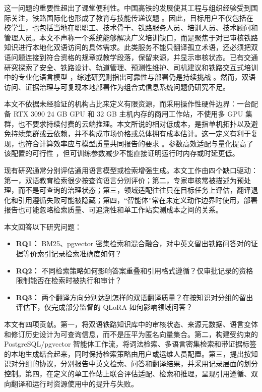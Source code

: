 这一问题的重要性超出了课堂便利性。中国高铁的发展使其工程与组织经验受到国际关注，铁路国际化也形成了教育与技能传递议题 \citep{lawrence2019hsr,xu2018education}。因此，目标用户不仅包括在校学生，也包括当地在职职工、技术骨干、铁路服务人员、培训人员、技术顾问和管理人员。本文不声称一个系统能够解决广义培训缺口，而是聚焦于对已审核铁路知识进行本地化双语访问的具体需求。此类服务不能只翻译孤立术语，还必须把双语问题连接到符合资格的规章或教学段落，保留来源，并显示审核状态。已有交通研究探索了安全、铁路设计、轨道管理、预测性维护、司机建议和铁路交互式培训中的专业化语言模型 \citep{zheng2023trafficsafety,lahnalampi2024rail,wang2024phm,song2025railway,luo2025driver,li2025training}，综述研究则指出可靠性与部署仍是持续挑战 \citep{wandelt2024transport}。然而，双语访问、证据治理与可复现本地部署作为组合式信息系统问题仍研究不足。

本文不依据未经验证的机构占比来定义有限资源，而采用操作性硬件边界：一台配备 RTX 3090 24 GB GPU 和 32 GB 主机内存的商用工作站，不使用多 GPU 集群，也不要求持续付费的云端推理。本文所说的相对低成本，是指单机拓扑以及避免持续集群或云依赖，并不构成市场价格或总体拥有成本估计。这一定义有利于复现，也符合计算效率应与模型质量共同报告的要求 \citep{schwartz2020green}。参数高效适配与量化提高了该配置的可行性 \citep{dettmers2023qlora,ding2023peft,lv2024full,wang2025peft}，但可训练参数减少不能直接证明运行时内存或时延更低。

现有研究通常分别评估通用语言模型或检索增强生成。本文工作由四个缺口驱动：第一，双语教育检索很少按查询语言分别评价；第二，专家审核常被描述为预处理，而不是可查询的治理状态；第三，领域适配往往只在目标任务上评估，翻译退化和引用遵循失败可能被隐藏；第四，“智能体”常在未定义动作边界时使用，部署报告也可能忽略检索质量、可追溯性和单工作站实测成本之间的关系。

本文回答以下研究问题：

\begin{itemize}
\item \textbf{RQ1：} BM25、pgvector 密集检索和混合融合，对中英文留出铁路问答对的证据等价索引记录检索准确度如何？
\item \textbf{RQ2：} 不同检索策略如何影响答案重叠和引用格式遵循？仅审批记录的资格限制能否在检索时被执行和审计？
\item \textbf{RQ3：} 两个翻译方向分别达到怎样的双语翻译质量？在按知识对分组的留出评估下，仅完成部分监督的 QLoRA 如何影响领域问答？
\end{itemize}

本文有四项贡献。第一，将双语铁路知识库中的审核状态、来源元数据、语言变体和修订历史设计为可查询信息，而不是压平为匿名向量集合。第二，构建受约束的 PostgreSQL/pgvector 智能体工作流，将词法检索、多语言密集检索和带证据标签的本地生成结合起来，同时保持检索策略由用户或运维人员配置。第三，提出按知识对分组的协议，分别报告中英文检索、问答和翻译结果，并采用记录层面的划分控制。第四，在定义的单工作站上联合评估适配、检索和推理，呈现引用遵循、双向翻译和运行时资源使用中的提升与失败。

